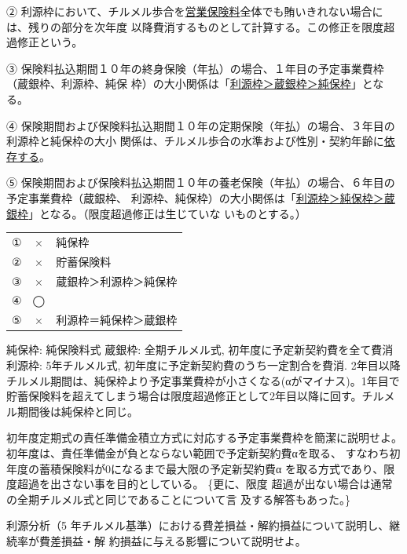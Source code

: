 \documentclass[report,gutter=10mm,fore-edge=10mm,uplatex,dvipdfmx]{jlreq}
\begin{document}
② 利源枠において、チルメル歩合を\underline{営業保険料}全体でも賄いきれない場合には、残りの部分を次年度
以降費消するものとして計算する。この修正を限度超過修正という。

③ 保険料払込期間１０年の終身保険（年払）の場合、１年目の予定事業費枠（蔵銀枠、利源枠、純保
枠）の大小関係は「\underline{利源枠＞蔵銀枠＞純保枠}」となる。

④ 保険期間および保険料払込期間１０年の定期保険（年払）の場合、３年目の利源枠と純保枠の大小
関係は、チルメル歩合の水準および性別・契約年齢に\underline{依存する}。

⑤ 保険期間および保険料払込期間１０年の養老保険（年払）の場合、６年目の予定事業費枠（蔵銀枠、
利源枠、純保枠）の大小関係は「\underline{利源枠＞純保枠＞蔵銀枠}」となる。（限度超過修正は生じていな
いものとする。）
\answer{}
\begin{tabular}{ccl}
 ①& ×& 純保枠\\
 ②& ×& 貯蓄保険料\\
 ③& ×& 蔵銀枠＞利源枠＞純保枠\\
 ④&◯ &\\
 ⑤& ×& 利源枠＝純保枠＞蔵銀枠\\
\end{tabular}

純保枠: 純保険料式
蔵銀枠: 全期チルメル式, 初年度に予定新契約費を全て費消
利源枠: 5年チルメル式, 初年度に予定新契約費のうち一定割合を費消. 2年目以降チルメル期間は、純保枠より予定事業費枠が小さくなる(αがマイナス)。1年目で貯蓄保険料を超えてしまう場合は限度超過修正として2年目以降に回す。チルメル期間後は純保枠と同じ。

初年度定期式の責任準備金積立方式に対応する予定事業費枠を簡潔に説明せよ。
\answer{}
初年度は、責任準備金が負とならない範囲で予定新契約費αを取る、
すなわち初年度の蓄積保険料が0になるまで最大限の予定新契約費α
を取る方式であり、限度超過を出さない事を目的としている。
\{更に、限度
超過が出ない場合は通常の全期チルメル式と同じであることについて言
及する解答もあった。\}

利源分析（5 年チルメル基準）における費差損益・解約損益について説明し、継続率が費差損益・解
約損益に与える影響について説明せよ。
\answer{}
\end{document}
